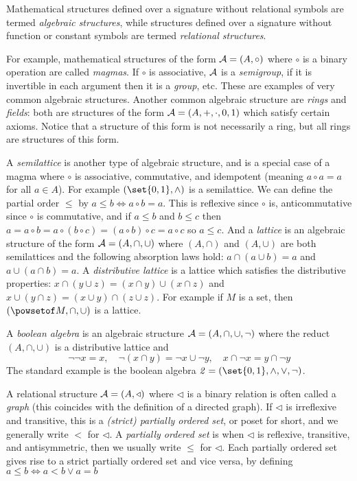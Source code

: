 Mathematical structures defined over a signature without relational symbols are termed {\it algebraic structures}, while structures defined over a signature without function or constant symbols are termed
{\it relational structures}.

For example, mathematical structures of the form ${\cal A}=(A,\circ)$ where $\circ$ is a binary operation are called {\it magmas}.
If $\circ$ is associative, ${\cal A}$ is a {\it semigroup}, if it is invertible in each argument then it is a {\it group}, etc.
These are examples of very common algebraic structures.
Another common algebraic structure are {\it rings} and {\it fields}: both are structures of the form ${\cal A}=(A,+,\cdot,0,1)$ which satisfy certain axioms.
Notice that a structure of this form is not necessarily a ring, but all rings are structures of this form.

A {\it semilattice} is another type of algebraic structure, and is a special case of a magma where $\circ$ is associative, commutative, and idempotent (meaning $a\circ a=a$ for all $a\in A$).
For example $(\set{0,1},\land)$ is a semilattice.
We can define the partial order $\leq$ by $a\leq b\iff a\circ b=a$.
This is reflexive since $\circ$ is, anticommutative since $\circ$ is commutative, and if $a\leq b$ and $b\leq c$ then $a=a\circ b=a\circ(b\circ c)=(a\circ b)\circ c=a\circ c$ so $a\leq c$.
And a {\it lattice} is an algebraic structure of the form ${\cal A}=(A,\cap,\cup)$ where $(A,\cap)$ and $(A,\cup)$ are both semilattices and the following absorption laws hold: $a\cap(a\cup b)=a$ and
$a\cup(a\cap b)=a$.
A {\it distributive lattice} is a lattice which satisfies the distributive properties: $x\cap(y\cup z)=(x\cap y)\cup(x\cap z)$ and $x\cup(y\cap z)=(x\cup y)\cap(z\cup z)$.
For example if $M$ is a set, then $(\powsetof M,\cap,\cup)$ is a lattice.

A {\it boolean algebra} is an algebraic structure ${\cal A}=(A,\cap,\cup,\neg)$ where the reduct $(A,\cap,\cup)$ is a distributive lattice and
$$ \neg\neg x = x,\quad \neg(x\cap y)=\neg x\cup\neg y,\quad x\cap\neg x=y\cap\neg y $$
The standard example is the boolean algebra ${\it2}=(\set{0,1},\land,\lor,\neg)$.

A relational structure ${\cal A}=(A,\triangleleft)$ where $\triangleleft$ is a binary relation is often called a {\it graph} (this coincides with the definition of a directed graph).
If $\triangleleft$ is irreflexive and transitive, this is a {\it (strict) partially ordered set}, or poset for short, and we generally write $<$ for $\triangleleft$.
A {\it partially ordered set} is when $\triangleleft$ is reflexive, transitive, and antisymmetric, then we usually write $\leq$ for $\triangleleft$.
Each partially ordered set gives rise to a strict partially ordered set and vice versa, by defining $a\leq b\iff a<b\lor a=b$

